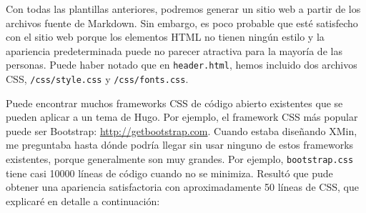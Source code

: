 \documentclass[12pt,]{krantz}
\theoremstyle{definition}
\theoremstyle{definition}
\theoremstyle{definition}
\theoremstyle{remark}
\begin{document}
Con todas las plantillas anteriores, podremos generar un sitio web a
partir de los archivos fuente de Markdown. Sin embargo, es poco probable
que esté satisfecho con el sitio web porque los elementos HTML no tienen
ningún estilo y la apariencia predeterminada puede no parecer atractiva
para la mayoría de las personas. Puede haber notado que en
\texttt{header.html}, hemos incluido dos archivos CSS,
\texttt{/css/style.css} y \texttt{/css/fonts.css}.

Puede encontrar muchos frameworks CSS de código abierto existentes que
se pueden aplicar a un tema de Hugo. Por ejemplo, el framework CSS más
popular puede ser Bootstrap: \url{http://getbootstrap.com}. Cuando
estaba diseñando XMin, me preguntaba hasta dónde podría llegar sin usar
ninguno de estos frameworks existentes, porque generalmente son muy
grandes. Por ejemplo, \texttt{bootstrap.css} tiene casi 10000 líneas de
código cuando no se minimiza. Resultó que pude obtener una apariencia
satisfactoria con aproximadamente 50 líneas de CSS, que explicaré en
detalle a continuación:
\end{document}
